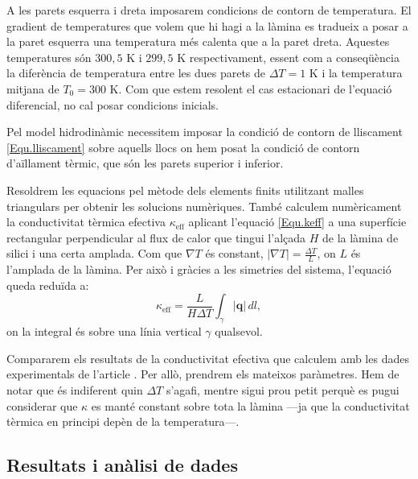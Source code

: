 \documentclass{article}
\begin{document}
A les parets esquerra i dreta imposarem condicions de contorn de temperatura. El gradient de temperatures que volem que hi hagi a la l\`{a}mina es tradueix a posar a la paret esquerra una temperatura m\'{e}s calenta que a la paret dreta. Aquestes temperatures s\'{o}n $300,5$ K i $299,5$ K respectivament, essent com a conseq\"{u}\`{e}ncia la difer\`{e}ncia de temperatura entre les dues parets de $\Delta T=1$ K i la temperatura mitjana de $T_0=300$ K. Com que estem resolent el cas estacionari de l'equaci\'{o} diferencial, no cal posar condicions inicials.

Pel model hidrodin\`{a}mic necessitem imposar la condici\'{o} de contorn de lliscament \eqref{Equ.lliscament} sobre aquells llocs on hem posat la condici\'{o} de contorn d'a\"{i}llament t\`{e}rmic, que s\'{o}n les parets superior i inferior.

Resoldrem les equacions pel m\`{e}tode dels elements finits utilitzant malles triangulars per obtenir les solucions num\`{e}riques. Tamb\'{e} calculem num\`{e}ricament la conductivitat t\`{e}rmica efectiva $\kappa_{\text{eff}}$ aplicant l'equaci\'{o} \eqref{Equ.keff} a una superf\'{i}cie rectangular perpendicular al flux de calor que tingui l'al\c{c}ada $H$ de la l\`{a}mina de silici i una certa amplada. Com que $\nabla T$ \'{e}s constant, $|\nabla T|=\frac{\Delta T}{L}$, on $L$ \'{e}s l'amplada de la l\`{a}mina. Per aix\`{o} i gr\`{a}cies a les simetries del sistema, l'equaci\'{o} queda redu\"{i}da a:
\begin{equation}\label{Equ.keff film}
\kappa_{\text{eff}}=\frac{L}{H\Delta T}\int_{\gamma}|\boldsymbol{q}|\,dl,
\end{equation}
on la integral \'{e}s sobre una l\'{i}nia vertical $\gamma$ qualsevol.

Compararem els resultats de la conductivitat efectiva que calculem amb les dades experimentals de l'article \cite{beardo2019hydrodynamic}. Per all\`{o}, prendrem els mateixos par\`{a}metres. Hem de notar que \'{e}s indiferent quin $\Delta T$ s'agafi, mentre sigui prou petit perqu\`{e} es pugui considerar que $\kappa$ es mant\'{e} constant sobre tota la l\`{a}mina ---ja que la conductivitat t\`{e}rmica en principi dep\`{e}n de la temperatura---.

\subsection{Resultats i an\`{a}lisi de dades}
\end{document}
